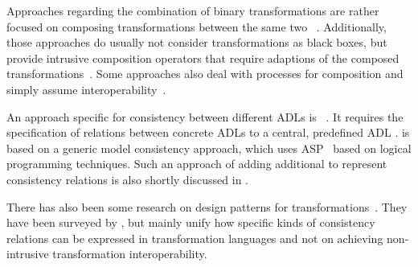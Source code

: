 Approaches regarding the combination of binary transformations are rather focused on composing transformations between the same two \metamodels~\cite{wagelaar2008a, wagelaar2010a, wagelaar2011a}.
Additionally, those approaches do usually not consider transformations as black boxes, but provide intrusive composition operators that require adaptions of the composed transformations~\cite{cuadrado2008a}.
Some approaches also deal with processes for %
composition %
and simply assume interoperability~\cite{oldevik2005a}.

An approach specific for consistency between different \acp{ADL} is \dually~\cite{malavolta2010a,eramo2012a}. 
It requires the specification of relations between concrete \acp{ADL} to a central, predefined \ac{ADL} \metamodel.
\dually is based on a generic model consistency approach, which uses \ac{ASP}~\cite{cicchetti2006a,eramo2008a} based on logical programming techniques. %
Such an approach of adding additional \metamodels to represent consistency relations is also shortly discussed in \cite{stevens2017a}. %

There has also been some research on design patterns for transformations~\cite{iacob2008a, lano2014a}.
They have been surveyed by \textcite{lano2018a}, but mainly unify how specific kinds of consistency relations can be expressed in transformation languages and not on achieving non-intrusive transformation interoperability.


